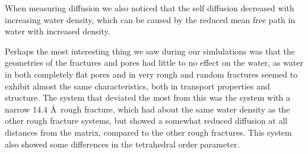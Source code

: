 When measuring diffusion we also noticed that the self diffusion decreased with increasing water density, which can be caused by the reduced mean free path in water with increased density.

Perhaps the most interesting thing we saw during our simlulations was that the geometries of the fractures and pores had little to no effect on the water, as water in both completely flat pores and in very rough and random fractures seemed to exhibit almost the same characteristics, both in transport properties and structure. The system that deviated the most from this was the system with a narrow 14.4 \AA\ rough fracture, which had about the same water density as the other rough fracture systems, but showed a somewhat reduced diffusion at all distances from the matrix, compared to the other rough fractures. This system also showed some differences in the tetrahedral order parameter.


% 






